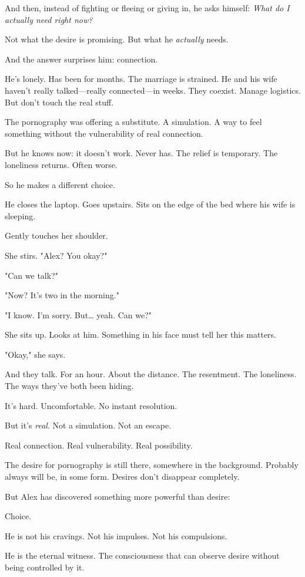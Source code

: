 \documentclass[11pt,twoside]{book}
\begin{document}
And then, instead of fighting or fleeing or giving in, he asks himself: \emph{What do I actually need right now?}

Not what the desire is promising. But what he \emph{actually} needs.

And the answer surprises him: connection.

He's lonely. Has been for months. The marriage is strained. He and his wife haven't really talked—really connected—in weeks. They coexist. Manage logistics. But don't touch the real stuff.

The pornography was offering a substitute. A simulation. A way to feel something without the vulnerability of real connection.

But he knows now: it doesn't work. Never has. The relief is temporary. The loneliness returns. Often worse.

So he makes a different choice.

He closes the laptop. Goes upstairs. Sits on the edge of the bed where his wife is sleeping.

Gently touches her shoulder.

She stirs. "Alex? You okay?"

"Can we talk?"

"Now? It's two in the morning."

"I know. I'm sorry. But\ldots{} yeah. Can we?"

She sits up. Looks at him. Something in his face must tell her this matters.

"Okay," she says.

And they talk. For an hour. About the distance. The resentment. The loneliness. The ways they've both been hiding.

It's hard. Uncomfortable. No instant resolution.

But it's \emph{real}. Not a simulation. Not an escape.

Real connection. Real vulnerability. Real possibility.

The desire for pornography is still there, somewhere in the background. Probably always will be, in some form. Desires don't disappear completely.

But Alex has discovered something more powerful than desire:

Choice.

He is not his cravings. Not his impulses. Not his compulsions.

He is the eternal witness. The consciousness that can observe desire without being controlled by it.
\end{document}
